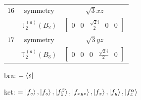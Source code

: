 \documentclass[fleqn,8pt,landscape]{jsarticle}
\begin{document}
\begin{longtable}{ccc}
$ 16 $ & $ \text{symmetry} $ & $ \sqrt{3} x z $ \\
$  $ & $ \mathbb{T}_{2}^{(a)}(B_{2}) $ & $ \begin{bmatrix} 0 & 0 & \frac{\sqrt{2} i}{2} & 0 & 0 \end{bmatrix} $ \\ \hline
$ 17 $ & $ \text{symmetry} $ & $ \sqrt{3} y z $ \\
$  $ & $ \mathbb{T}_{2}^{(a)}(B_{3}) $ & $ \begin{bmatrix} 0 & 0 & 0 & \frac{\sqrt{2} i}{2} & 0 \end{bmatrix} $ \\ \hline
\end{longtable}
bra: $=\bra{s}$

\noindent
ket: $=\ket{f_{c}}, \ket{f_{s}}, \ket{f_{z}^{\beta}}, \ket{f_{xyz}}, \ket{f_{x}}, \ket{f_{y}}, \ket{f_{z}^{\alpha}}$
\renewcommand{\arraystretch}{1.6}
\end{document}
